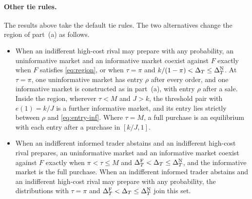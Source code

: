 \paragraph{Other tie rules.}
The results above take the default tie rules. The two alternatives change the region of part~(a) as follows.
\begin{itemize}[leftmargin=2em]
\item When an indifferent high-cost rival may prepare with any probability, an uninformative market and an informative
market coexist against \(F\) exactly when \(F\) satisfies \eqref{eq:region}, or when \(\tau=\pi\) and
\(k/(1-\pi)<\Delta_T\le\Delta_T^{\rm N}\). At \(\tau=\pi\), one uninformative market has entry \(\rho\) after every order, and one
informative market is constructed as in part~(a), with entry \(\rho\) after a sale. Inside the region, wherever \(\tau<M\)
and \(J>k\), the threshold pair with \(e(1)=k/J\) is a further informative market, and its entry lies strictly between
\(\rho\) and \eqref{eq:entry-inf}. Where \(\tau=M\), a full purchase is an equilibrium with each entry after a purchase
in \([k/J,1]\).
\item When an indifferent informed trader abstains and an indifferent high-cost rival prepares, an uninformative market and an
informative market coexist against \(F\) exactly when \(\pi<\tau\le M\) and \(\Delta_T^{\rm F}<\Delta_T\le\Delta_T^{\rm N}\), and the
informative market is the full purchase. When an indifferent informed trader abstains and an indifferent high-cost rival
may prepare with any probability, the distributions with \(\tau=\pi\) and \(\Delta_T^{\rm F}<\Delta_T\le\Delta_T^{\rm N}\) join this set.
\end{itemize}

